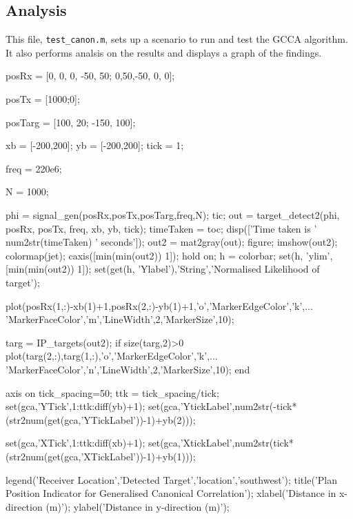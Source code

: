 \documentclass[12pt,openany,a4paper]{book}
\begin{document}
\subsection{Analysis}
This file, \verb+test_canon.m+, sets up a scenario to run and test the GCCA algorithm. It also performs analsis on the results and displays a graph of the findings.
\begin{spverbatim}
posRx = [0, 0, 0, -50, 50;
         0,50,-50, 0,  0];   

posTx = [1000;0];

posTarg = [100, 20;
          -150, 100];

xb = [-200,200];
yb = [-200,200];
tick = 1; %

freq = 220e6;

N = 1000;

phi = signal_gen(posRx,posTx,posTarg,freq,N);
tic;
out = target_detect2(phi, posRx, posTx, freq, xb, yb, tick);
timeTaken = toc;
disp(['Time taken is ' num2str(timeTaken) ' seconds']);
out2 = mat2gray(out);
figure;
imshow(out2);
colormap(jet);
caxis([min(min(out2)) 1]);
hold on;
h = colorbar;
set(h, 'ylim', [min(min(out2)) 1]);
set(get(h, 'Ylabel'),'String','Normalised Likelihood of target');

plot(posRx(1,:)-xb(1)+1,posRx(2,:)-yb(1)+1,'o','MarkerEdgeColor','k',...
    'MarkerFaceColor','m','LineWidth',2,'MarkerSize',10);

targ = IP_targets(out2);
if size(targ,2)>0
    plot(targ(2,:),targ(1,:),'o','MarkerEdgeColor','k',...
    'MarkerFaceColor','n','LineWidth',2,'MarkerSize',10);
end

axis on
tick_spacing=50;
ttk = tick_spacing/tick;
set(gca,'YTick',1:ttk:diff(yb)+1);
set(gca,'YtickLabel',num2str(-tick*(str2num(get(gca,'YTickLabel'))-1)+yb(2)));

set(gca,'XTick',1:ttk:diff(xb)+1);
set(gca,'XtickLabel',num2str(tick*(str2num(get(gca,'XTickLabel'))-1)+yb(1)));


legend('Receiver Location','Detected Target','location','southwest');
title('Plan Position Indicator for Generalised Canonical Correlation');
xlabel('Distance in x-direction (m)');
ylabel('Distance in y-direction (m)');
\end{spverbatim}
\end{document}
